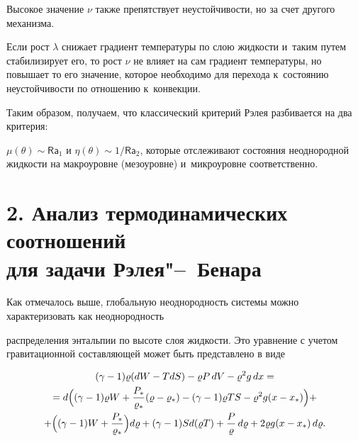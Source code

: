 Высокое значение $\nu$ также препятствует неустойчивости, но за счет другого механизма. 

Если рост $\lambda$ снижает градиент температуры по слою жидкости и~таким путем стабилизирует его, то рост $\nu$ не влияет на сам градиент температуры, но повышает то его значение, которое необходимо для перехода к~состоянию неустойчивости по отношению к~конвекции.



Таким образом, получаем, что классический критерий Рэлея разбивается на два критерия:  


$\mu(\theta)\sim \mathsf{Ra}_1$ и $\eta(\theta)\sim 1/\mathsf{Ra}_2$, которые отслеживают состояния неоднородной жидкости на макроуровне (мезоуровне) и~микроуровне соответственно.







\section*{\large 2. Анализ термодинамических соотношений \\ \phantom{2.}  для задачи Рэлея"--~Бенара}



\indent



Как отмечалось выше, глобальную неоднородность системы можно характеризовать как неоднородность

распределения энтальпии по высоте слоя жидкости. Это уравнение с учетом гравитационной составляющей может быть представлено в виде \cite{lukashev:bib51}

\begin{multline}

\label{lukashev:*H}

(\gamma-1)\varrho(dW-TdS)-\varrho P \, dV-\varrho^2 g \, dx=\\

=d\Bigl(

(\gamma-1) \varrho W+\frac{P_*}{\varrho_*}(\varrho-\varrho_*)-(\gamma-1)\varrho TS-\varrho^2 g (x-x_*)

\Bigr)+\\

+\Bigl(

(\gamma-1) W+\frac{P_*}{\varrho_*}

\Bigr) d\varrho+(\gamma-1) S d(\varrho T)+\frac{P}{\varrho} \, d\varrho+2\varrho g (x-x_*)\, d\varrho.

\end{multline}

